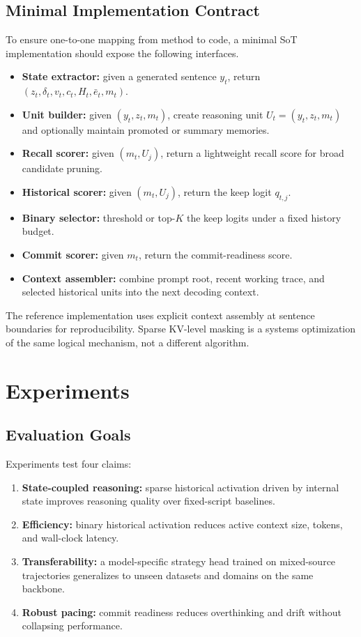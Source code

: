 \documentclass{article}
\begin{document}
\subsection{Minimal Implementation Contract}
\label{sec:contract}
To ensure one-to-one mapping from method to code, a minimal SoT implementation should expose the following interfaces.
\begin{itemize}[leftmargin=1.3em, itemsep=0.2em]
    \item \textbf{State extractor:} given a generated sentence $y_t$, return $(z_t,\delta_t,v_t,c_t,H_t,\bar e_t,m_t)$.
    \item \textbf{Unit builder:} given $(y_t,z_t,m_t)$, create reasoning unit $U_t=(y_t,z_t,m_t)$ and optionally maintain promoted or summary memories.
    \item \textbf{Recall scorer:} given $(m_t,U_j)$, return a lightweight recall score for broad candidate pruning.
    \item \textbf{Historical scorer:} given $(m_t,U_j)$, return the keep logit $q_{t,j}$.
    \item \textbf{Binary selector:} threshold or top-$K$ the keep logits under a fixed history budget.
    \item \textbf{Commit scorer:} given $m_t$, return the commit-readiness score.
    \item \textbf{Context assembler:} combine prompt root, recent working trace, and selected historical units into the next decoding context.
\end{itemize}
The reference implementation uses explicit context assembly at sentence boundaries for reproducibility. Sparse KV-level masking is a systems optimization of the same logical mechanism, not a different algorithm.

\section{Experiments}
\label{sec:experiments}

\subsection{Evaluation Goals}
Experiments test four claims:
\begin{enumerate}[leftmargin=1.3em, itemsep=0.2em]
    \item \textbf{State-coupled reasoning:} sparse historical activation driven by internal state improves reasoning quality over fixed-script baselines.
    \item \textbf{Efficiency:} binary historical activation reduces active context size, tokens, and wall-clock latency.
    \item \textbf{Transferability:} a model-specific strategy head trained on mixed-source trajectories generalizes to unseen datasets and domains on the same backbone.
    \item \textbf{Robust pacing:} commit readiness reduces overthinking and drift without collapsing performance.
\end{enumerate}
\end{document}
